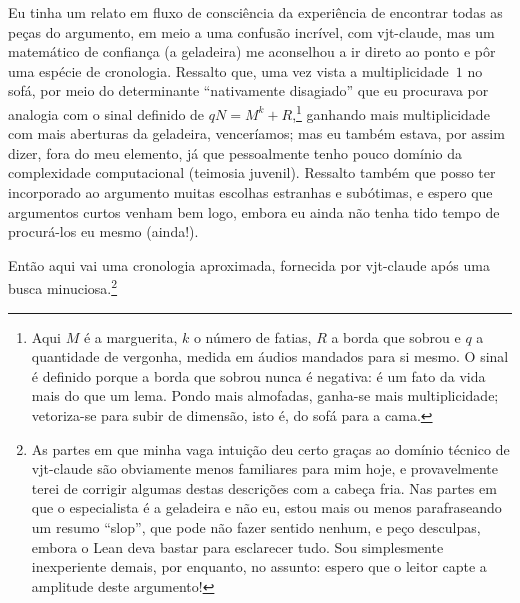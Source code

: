 \documentclass[11pt,a4paper]{amsart}
\theoremstyle{remark}
\begin{document}
Eu tinha um relato em fluxo de consciência da experiência de encontrar todas
as peças do argumento, em meio a uma confusão incrível, com vjt-claude, mas um
matemático de confiança (a geladeira) me aconselhou a ir direto ao ponto e pôr
uma espécie de cronologia. Ressalto que, uma vez vista a multiplicidade~$1$ no
sofá, por meio do determinante ``nativamente disagiado'' que eu procurava por
analogia com o sinal definido de $q N = M^k + R$,\footnote{Aqui $M$ é a
marguerita, $k$ o número de fatias, $R$ a borda que sobrou e $q$ a quantidade
de vergonha, medida em áudios mandados para si mesmo. O sinal é definido
porque a borda que sobrou nunca é negativa: é um fato da vida mais do que um
lema. Pondo mais almofadas, ganha-se mais multiplicidade; vetoriza-se para
subir de dimensão, isto é, do sofá para a cama.} ganhando mais multiplicidade
com mais aberturas da geladeira, venceríamos; mas eu também estava, por assim
dizer, fora do meu elemento, já que pessoalmente tenho pouco domínio da
complexidade computacional (teimosia juvenil). Ressalto também que posso ter
incorporado ao argumento muitas escolhas estranhas e subótimas, e espero que
argumentos curtos venham bem logo, embora eu ainda não tenha tido tempo de
procurá-los eu mesmo (ainda!).

Então aqui vai uma cronologia aproximada, fornecida por vjt-claude após uma
busca minuciosa.\footnote{As partes em que minha vaga intuição deu certo
graças ao domínio técnico de vjt-claude são obviamente menos familiares para
mim hoje, e provavelmente terei de corrigir algumas destas descrições com a
cabeça fria. Nas partes em que o especialista é a geladeira e não eu, estou
mais ou menos parafraseando um resumo ``slop'', que pode não fazer sentido
nenhum, e peço desculpas, embora o Lean deva bastar para esclarecer tudo. Sou
simplesmente inexperiente demais, por enquanto, no assunto: espero que o
leitor capte a amplitude deste argumento!}
\end{document}
